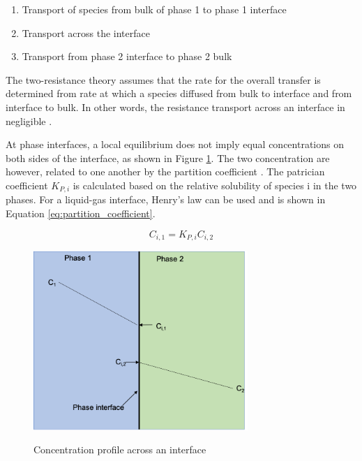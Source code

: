 \newpage

\begin{enumerate}
	\item Transport of species from bulk of phase 1 to phase 1 interface
	\item Transport across the interface
	\item Transport from phase 2 interface to phase 2 bulk
\end{enumerate}

The two-resistance theory assumes that the rate for the overall transfer is determined from rate at which a species diffused from bulk to interface and from interface to bulk. In other words, the resistance transport across an interface in negligible \cite{wilson1969}. 

At phase interfaces, a local equilibrium does not imply equal concentrations on both sides of the interface, as shown in Figure \ref{fig:general_phase_interface}. The two concentration are however, related to one another by the partition coefficient \cite{deen2016}. The patrician coefficient $K_{P,i}$ is calculated based on the relative solubility of species i in the two phases. For a liquid-gas interface, Henry's law can be used and is shown in Equation \ref{eq:partition_coefficient}.

 \begin{equation}
	C_{i,1} = K_{P,i}C_{i,2}
	\label{eq:partition_coefficient}
\end{equation}

\begin{figure}[ht]
  \centering
  \includegraphics[width=3.2in]{images/general_phase_interface.png}\\
  \caption{Concentration profile across an interface}
  \label{fig:general_phase_interface}
\end{figure} 

\newpage

